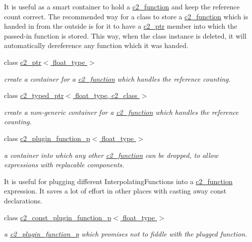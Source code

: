\begin{DoxyCompactItemize}
\begin{DoxyCompactList}
It is useful as a smart container to hold a \hyperlink{classc2__function}{c2\-\_\-function} and keep the reference count correct. The recommended way for a class to store a \hyperlink{classc2__function}{c2\-\_\-function} which is handed in from the outside is for it to have a \hyperlink{classc2__ptr}{c2\-\_\-ptr} member into which the passed-\/in function is stored. This way, when the class instance is deleted, it will automatically dereference any function which it was handed. \end{DoxyCompactList}\item 
class \hyperlink{classc2__ptr}{c2\-\_\-ptr$<$ float\-\_\-type $>$}
\begin{DoxyCompactList}\small\item\em create a container for a \hyperlink{classc2__function}{c2\-\_\-function} which handles the reference counting. \end{DoxyCompactList}\item 
class \hyperlink{classc2__typed__ptr}{c2\-\_\-typed\-\_\-ptr$<$ float\-\_\-type, c2\-\_\-class $>$}
\begin{DoxyCompactList}\small\item\em create a non-\/generic container for a \hyperlink{classc2__function}{c2\-\_\-function} which handles the reference counting. \end{DoxyCompactList}\item 
class \hyperlink{classc2__plugin__function__p}{c2\-\_\-plugin\-\_\-function\-\_\-p$<$ float\-\_\-type $>$}
\begin{DoxyCompactList}\small\item\em a container into which any other \hyperlink{classc2__function}{c2\-\_\-function} can be dropped, to allow expressions with replacable components.

It is useful for plugging different Interpolating\-Functions into a \hyperlink{classc2__function}{c2\-\_\-function} expression. It saves a lot of effort in other places with casting away const declarations. \end{DoxyCompactList}\item 
class \hyperlink{classc2__const__plugin__function__p}{c2\-\_\-const\-\_\-plugin\-\_\-function\-\_\-p$<$ float\-\_\-type $>$}
\begin{DoxyCompactList}\small\item\em a \hyperlink{classc2__plugin__function__p}{c2\-\_\-plugin\-\_\-function\-\_\-p} which promises not to fiddle with the plugged function.


\end{DoxyCompactList}
\end{DoxyCompactItemize}
